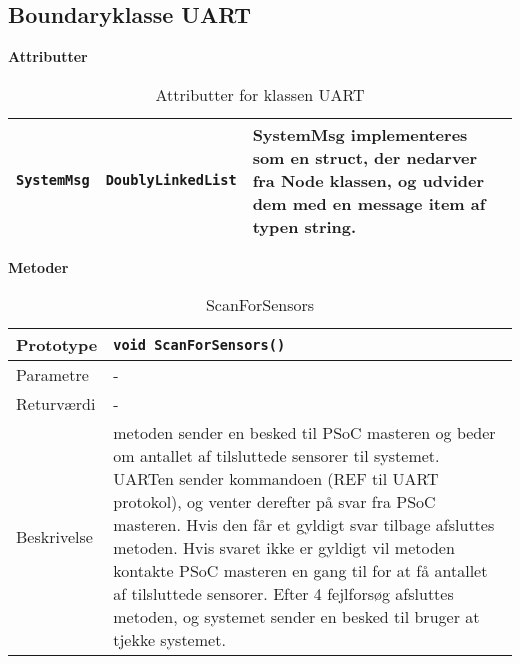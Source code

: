 \clearpage

\subsection{Boundaryklasse UART}

\textbf{Attributter} %

\begin{table}[h]
\begin{tabularx}{\textwidth}{| >{\raggedright\arraybackslash}X | >{\raggedright\arraybackslash}X | >{\raggedright\arraybackslash}p{10 cm} |} \hline
\texttt{SystemMsg} & \texttt{DoublyLinkedList} & SystemMsg implementeres som en struct, der nedarver fra Node klassen, og udvider dem med en message item af typen string. \\\hline
\end{tabularx}
\caption{Attributter for klassen UART}
\label{table:UART_attributter}
\end{table}

\textbf{Metoder}

\begin{table}[h]
\begin{tabularx}{\textwidth}{| >{\raggedright\arraybackslash}p{2.5 cm} | >{\raggedright\arraybackslash}X |} \hline
Prototype & \texttt{void ScanForSensors()} \\\hline
Parametre & - \\\hline
Returværdi & - \\\hline
Beskrivelse & metoden sender en besked til PSoC masteren og beder om antallet af tilsluttede sensorer til systemet. UARTen sender kommandoen (REF til UART protokol), og venter derefter på svar fra PSoC masteren. Hvis den får et gyldigt svar tilbage afsluttes metoden. Hvis svaret ikke er gyldigt vil metoden kontakte PSoC masteren en gang til for at få antallet af tilsluttede sensorer. Efter 4 fejlforsøg afsluttes metoden, og systemet sender en besked til bruger at tjekke systemet. \\\hline
\end{tabularx}
\caption{ScanForSensors}
\label{table:ScanForSensors}
\end{table}


